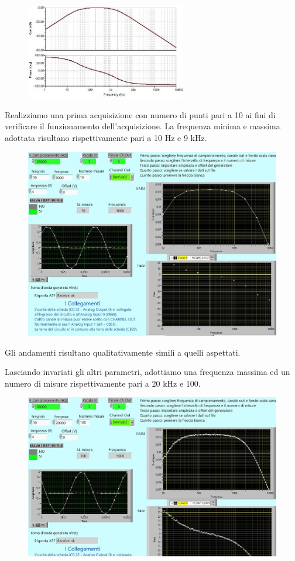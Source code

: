 \begin{figure}[H]
\caption{}
    \includegraphics[width=7cm]{settimana_2/immagini/RCCR_tina_transfer.jpg}
    \centering
\end{figure}

Realizziamo una prima acquisizione con numero di punti pari a 10 ai fini di verificare il funzionamento dell'acquisizione. La frequenza minima e massima adottata risultano rispettivamente pari a 10 Hz e 9 kHz.

\begin{figure}[H]
\caption{}
    \includegraphics[width=12cm]{settimana_2/immagini/rccr_1.jpg}
    \centering
\end{figure}

Gli andamenti risultano qualitativamente simili a quelli aspettati.

Lasciando invariati gli altri parametri, adottiamo una frequenza massima ed un numero di misure rispettivamente pari a 20 kHz e 100.

\begin{figure}[H]
\caption{}
    \includegraphics[width=12cm]{settimana_2/immagini/rccr_2.jpg}
    \centering
\end{figure}

